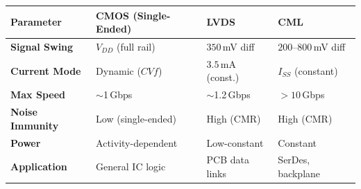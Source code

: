 \documentclass[12pt,a4paper]{article}
\renewcommand{\arraystretch}{1.45}
\begin{document}
\begin{tcolorbox}[tikzbox, title={\textbf{High-Speed Signaling Interface Comparison}}]
\centering
\par\noindent
\renewcommand{\arraystretch}{1.3}
\begin{tabularx}{\linewidth}{|B{2.4cm}|Y|Y|Y|}
\hline
\textbf{Parameter} & \textbf{CMOS (Single-Ended)} & \textbf{LVDS} & \textbf{CML} \\ \hline
\textbf{Signal Swing} & $V_{DD}$ (full rail) & $350\,$mV diff & $200$--$800\,$mV diff \\ \hline
\textbf{Current Mode} & Dynamic ($CV f$) & $3.5\,$mA (const.) & $I_{SS}$ (constant) \\ \hline
\textbf{Max Speed} & $\sim$1\,Gbps & $\sim$1.2\,Gbps & $>10\,$Gbps \\ \hline
\textbf{Noise Immunity} & Low (single-ended) & High (CMR) & High (CMR) \\ \hline
\textbf{Power} & Activity-dependent & Low-constant & Constant \\ \hline
\textbf{Application} & General IC logic & PCB data links & SerDes, backplane \\ \hline
\end{tabularx}
\end{tcolorbox}
\end{document}
